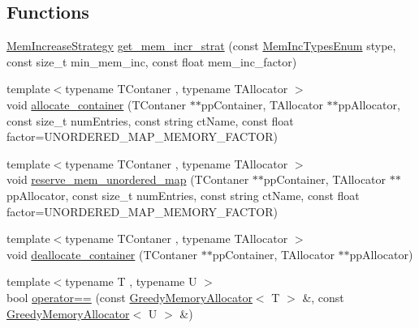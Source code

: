 \subsection*{Functions}
\begin{DoxyCompactItemize}
\item 
\hyperlink{classuva_1_1smt_1_1tries_1_1alloc_1_1_mem_increase_strategy}{Mem\+Increase\+Strategy} \hyperlink{namespaceuva_1_1smt_1_1tries_1_1alloc_aa5cce127acd56e3fa1b42c63f93f8548}{get\+\_\+mem\+\_\+incr\+\_\+strat} (const \hyperlink{namespaceuva_1_1smt_1_1tries_1_1alloc_aa19a45a19458f601785f08cb24e17f16}{Mem\+Inc\+Types\+Enum} stype, const size\+\_\+t min\+\_\+mem\+\_\+inc, const float mem\+\_\+inc\+\_\+factor)
\item 
{\footnotesize template$<$typename T\+Contaner , typename T\+Allocator $>$ }\\void \hyperlink{namespaceuva_1_1smt_1_1tries_1_1alloc_aeee3068d83602810dbafc8862a8a113f}{allocate\+\_\+container} (T\+Contaner $\ast$$\ast$pp\+Container, T\+Allocator $\ast$$\ast$pp\+Allocator, const size\+\_\+t num\+Entries, const string ct\+Name, const float factor=U\+N\+O\+R\+D\+E\+R\+E\+D\+\_\+\+M\+A\+P\+\_\+\+M\+E\+M\+O\+R\+Y\+\_\+\+F\+A\+C\+T\+O\+R)
\item 
{\footnotesize template$<$typename T\+Contaner , typename T\+Allocator $>$ }\\void \hyperlink{namespaceuva_1_1smt_1_1tries_1_1alloc_a2c181932d57f2889db12f245097d3b96}{reserve\+\_\+mem\+\_\+unordered\+\_\+map} (T\+Contaner $\ast$$\ast$pp\+Container, T\+Allocator $\ast$$\ast$pp\+Allocator, const size\+\_\+t num\+Entries, const string ct\+Name, const float factor=U\+N\+O\+R\+D\+E\+R\+E\+D\+\_\+\+M\+A\+P\+\_\+\+M\+E\+M\+O\+R\+Y\+\_\+\+F\+A\+C\+T\+O\+R)
\item 
{\footnotesize template$<$typename T\+Contaner , typename T\+Allocator $>$ }\\void \hyperlink{namespaceuva_1_1smt_1_1tries_1_1alloc_a8f63d24e724796c5c4daa555ee1f3bc7}{deallocate\+\_\+container} (T\+Contaner $\ast$$\ast$pp\+Container, T\+Allocator $\ast$$\ast$pp\+Allocator)
\item 
{\footnotesize template$<$typename T , typename U $>$ }\\bool \hyperlink{namespaceuva_1_1smt_1_1tries_1_1alloc_a9e2fd05ee524012c1fd4398fe457e5dc}{operator==} (const \hyperlink{classuva_1_1smt_1_1tries_1_1alloc_1_1_greedy_memory_allocator}{Greedy\+Memory\+Allocator}$<$ T $>$ \&, const \hyperlink{classuva_1_1smt_1_1tries_1_1alloc_1_1_greedy_memory_allocator}{Greedy\+Memory\+Allocator}$<$ U $>$ \&)

\end{DoxyCompactItemize}
